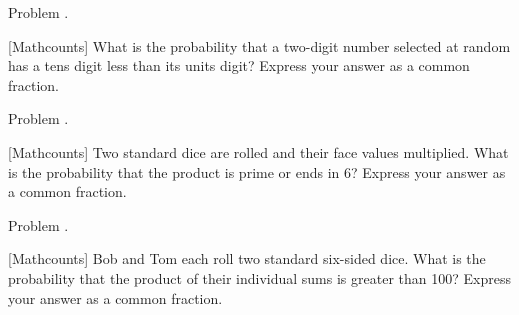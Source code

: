 \documentclass[9pt]{beamer}
\newcounter{problem}[section]
\begin{document}
\begin{frame}[t, fragile]{Problem \thesection.\theproblem}
    \begin{block}{}[Mathcounts]
     What is the probability that a two-digit number selected at random has a tens digit less than its units digit? Express your answer as a common fraction.
	
    \end{block}
\end{frame}
\begin{frame}[t, fragile]{Problem \thesection.\theproblem}
    \begin{block}{}[Mathcounts]
     Two standard dice are rolled and their face values multiplied. What is the probability that the product is prime or ends in 6? Express your answer as a common fraction.
    
	
    \end{block}
\end{frame}
\begin{frame}[t, fragile]{Problem \thesection.\theproblem}
    \begin{block}{}[Mathcounts]
     Bob and Tom each roll two standard six-sided dice. What is the probability that the product of their individual sums is greater than 100? Express your answer as a common fraction.
    
	
    \end{block}
\end{frame}
\end{document}
